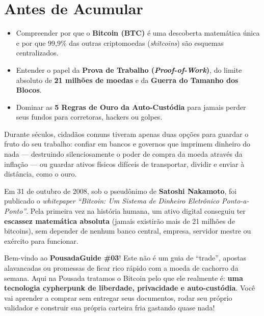 \documentclass{pousadaguide}
\begin{document}
\capa
\tableofcontents

\chapter{Antes de Acumular}

\begin{missao}
\begin{itemize}
  \item Compreender por que o \textbf{Bitcoin (BTC)} é uma descoberta matemática única e por que 99,9\% das outras criptomoedas (\emph{shitcoins}) são esquemas centralizados.
  \item Entender o papel da \textbf{Prova de Trabalho (\emph{Proof-of-Work})}, do limite absoluto de \textbf{21 milhões de moedas} e da \textbf{Guerra do Tamanho dos Blocos}.
  \item Dominar as \textbf{5 Regras de Ouro da Auto-Custódia} para jamais perder seus fundos para corretoras, hackers ou golpes.
\end{itemize}
\end{missao}

Durante séculos, cidadãos comuns tiveram apenas duas opções para guardar o fruto do seu trabalho: confiar em bancos e governos que imprimem dinheiro do nada — destruindo silenciosamente o poder de compra da moeda através da inflação — ou guardar ativos físicos difíceis de transportar, dividir e enviar à distância, como o ouro.

Em 31 de outubro de 2008, sob o pseudônimo de \textbf{Satoshi Nakamoto}, foi publicado o \emph{whitepaper} \emph{``Bitcoin: Um Sistema de Dinheiro Eletrônico Ponto-a-Ponto''}. Pela primeira vez na história humana, um ativo digital conseguiu ter \textbf{escassez matemática absoluta} (jamais existirão mais de 21 milhões de bitcoins), sem depender de nenhum banco central, empresa, servidor mestre ou exército para funcionar.

\begin{pousadinha}
Bem-vindo ao \textbf{PousadaGuide \#03}! Este não é um guia de ``trade'', apostas alavancadas ou promessas de ficar rico rápido com a moeda de cachorro da semana. Aqui na Pousada tratamos o Bitcoin pelo que ele realmente é: \textbf{uma tecnologia cypherpunk de liberdade, privacidade e auto-custódia}. Você vai aprender a comprar sem entregar seus documentos, rodar seu próprio validador e construir sua própria carteira fria gastando quase nada!
\end{pousadinha}
\end{document}
